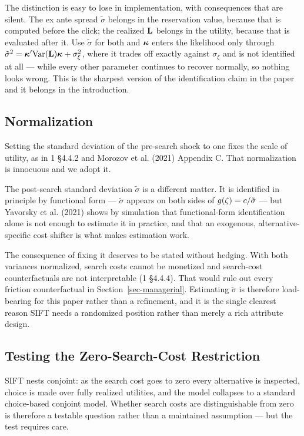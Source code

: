 \documentclass[
  letterpaper,
  DIV=11,
  numbers=noendperiod]{scrartcl}
\begin{document}
The distinction is easy to lose in implementation, with consequences
that are silent. The ex ante spread \(\tilde\sigma\) belongs in the
reservation value, because that is computed before the click; the
realized \(\mathbf{L}\) belongs in the utility, because that is evaluated
after it. Use \(\tilde\sigma\) for both and \(\boldsymbol{\kappa}\) enters the
likelihood only through
\(\tilde\sigma^2 = \boldsymbol{\kappa}'\mathrm{Var}(\mathbf{L})\boldsymbol{\kappa} + \sigma_\xi^2\),
where it trades off exactly against \(\sigma_\xi\) and is not identified
at all --- while every other parameter continues to recover normally, so
nothing looks wrong. This is the sharpest version of the identification
claim in the paper and it belongs in the introduction.

\subsection{Normalization}\label{sec-est-normalization}

Setting the standard deviation of the pre-search shock to one fixes the
scale of utility, as in 1 §4.4.2 and Morozov et al. (2021) Appendix C.
That normalization is innocuous and we adopt it.

The post-search standard deviation \(\tilde\sigma\) is a different
matter. It is identified in principle by functional form ---
\(\tilde\sigma\) appears on both sides of
\(g(\zeta) = c/\tilde\sigma\) --- but Yavorsky et al. (2021) shows
by simulation that functional-form identification alone is not enough to
estimate it in practice, and that an exogenous, alternative-specific
cost shifter is what makes estimation work.

The consequence of fixing it deserves to be stated without hedging. With
both variances normalized, search costs cannot be monetized and
search-cost counterfactuals are not interpretable (1 §4.4.4). That would
rule out every friction counterfactual in Section~\ref{sec-managerial}.
Estimating \(\tilde\sigma\) is therefore load-bearing for this paper
rather than a refinement, and it is the single clearest reason SIFT
needs a randomized position rather than merely a rich attribute design.

\subsection{Testing the Zero-Search-Cost
Restriction}\label{sec-est-nesting}

SIFT nests conjoint: as the search cost goes to zero every alternative
is inspected, choice is made over fully realized utilities, and the
model collapses to a standard choice-based conjoint model. Whether
search costs are distinguishable from zero is therefore a testable
question rather than a maintained assumption --- but the test requires
care.
\end{document}
